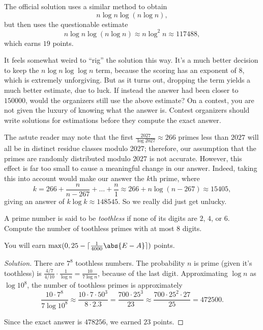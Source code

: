 \documentclass[11pt]{scrartcl}
\renewenvironment{solution}{\renewcommand\qedsymbol{$\blacksquare$}\begin{proof}[Solution]}{\end{proof}}
\begin{document}
\begin{remark*}
    The official solution uses a similar method to obtain
    \[n\log n\log(n \log n),\]
    but then uses the questionable estimate
    \[n\log n\log(n \log n) \approx n\log^2 n \approx 117488,\]
    which earns $19$ points.

    It feels somewhat weird to ``rig'' the solution this way. It's a much better decision to keep the $n \log n \log \log n$ term, because the scoring has an exponent of $8$, which is extremely unforgiving. But as it turns out, dropping the term yields a much better estimate, due to luck. If instead the answer had been closer to $150000$, would the organizers still use the above estimate? On a contest, you are not given the luxury of knowing what the answer is. Contest organizers should write solutions for estimations before they compute the exact answer.

	The astute reader may note that the first $\frac{2027}{\log 2027} \approx 266$ primes less than $2027$ will all be in distinct residue classes modulo $2027$; therefore, our assumption that the primes are randomly distributed modulo $2027$ is not accurate. However, this effect is far too small to cause a meaningful change in our answer. Indeed, taking this into account would make our answer the $k$th prime, where
	\[k = 266 + \frac n{n - 267} + \dots + \frac n1 \approx 266 + n\log(n - 267) \approx 15405,\]
	giving an answer of $k \log k \approx 148545$. So we really did just get unlucky.
\end{remark*}

\begin{example}
	A prime number is said to be \emph{toothless} if none of its digits are $2$, $4$, or $6$. Compute the number of toothless primes with at most $8$ digits.

	You will earn $\max(0,25 - \lceil\frac1{4000}\abs{E - A}\rceil)$ points.
\end{example}

\begin{solution}
	There are $7^8$ toothless numbers. The probability $n$ is prime (given it's toothless) is $\frac{4/7}{4/10} \cdot \frac1{\log n} = \frac{10}{7\log n}$, because of the last digit. Approximating $\log n$ as $\log 10^8$, the number of toothless primes is approximately
	\[\frac{10 \cdot 7^8}{7\log 10^8} \approx \frac{10 \cdot 7 \cdot 50^3}{8 \cdot 2.3} = \frac{700 \cdot 25^3}{23} \approx \frac{700 \cdot 25^2 \cdot 27}{25} = 472500.\]
	
	Since the exact answer is $478256$, we earned $23$ points.
\end{solution}
\end{document}
